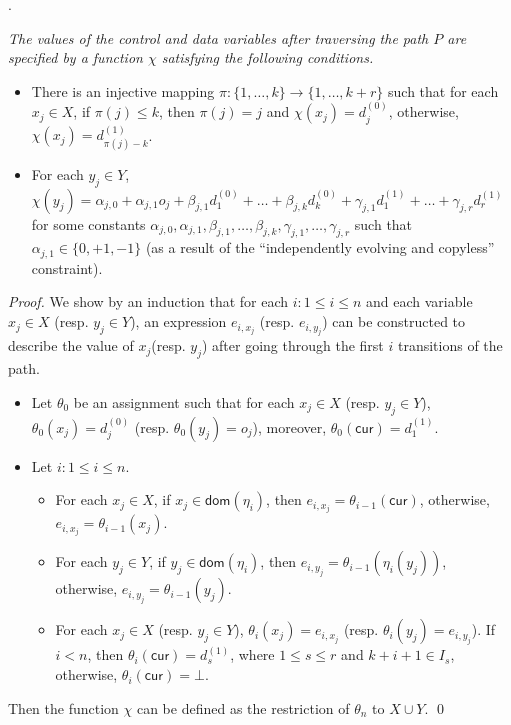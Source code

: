 \documentclass[runningheads,a4paper]{llncs}
\newcommand\cur{\mathsf{cur}}
\newcommand\dom{\mathsf{dom}}
\begin{document}
\begin{appendix}
.
{\it The values of the control and data variables after traversing the path $P$ are specified by a function $\chi$ satisfying the following conditions.
\begin{itemize}
\item There is an injective mapping $\pi: \{1,\dots,k\} \rightarrow \{1,\dots, k+r\}$ such that for each $x_j \in X$, if $\pi(j) \le k$, then $\pi(j)=j$ and $\chi(x_j)=d^{(0)}_{j}$, otherwise, $\chi(x_j)=d^{(1)}_{\pi(j)-k}$.
% 
\item For each $y_j \in Y$, $\chi(y_j) = \alpha_{j,0} + \alpha_{j,1} o_j + \beta_{j,1} d^{(0)}_1 + \dots + \beta_{j,k} d^{(0)}_k + \gamma_{j,1} d^{(1)}_1 +\dots + \gamma_{j,r} d^{(1)}_{r}$ for some constants $\alpha_{j,0},\alpha_{j,1}, \beta_{j,1},\dots,\beta_{j,k}, \gamma_{j,1},\dots,\gamma_{j,r}$ such that $\alpha_{j,1} \in \{0,+1,-1\}$ (as a result of the ``independently evolving and copyless'' constraint).
\end{itemize}
}

\begin{proof}
We show by an induction that for each $i: 1 \le i \le n$ and each variable $x_j \in X$ (resp. $y_j \in Y$), an expression $e_{i,x_j}$ (resp. $e_{i,y_j}$) can be constructed to describe the value of $x_j$(resp. $y_j$) after going through the first $i$ transitions of the path. 
%
\begin{itemize}
\item Let $\theta_0$ be an assignment such that for each $x_j \in X$ (resp. $y_j \in Y$), $\theta_0(x_j)=d^{(0)}_j$ (resp. $\theta_0(y_j)=o_j$), moreover, $\theta_0(\cur)=d^{(1)}_1$.
%
%
\item Let $i: 1 \le i \le n$. 
\begin{itemize}
\item For each $x_j \in X$, if $x_j \in \dom(\eta_i)$, then $e_{i,x_j}=\theta_{i-1}(\cur)$, otherwise, $e_{i,x_j}=\theta_{i-1}(x_j)$.
%
\item For each $y_j \in Y$, if $y_j \in \dom(\eta_i)$, then $e_{i,y_j} = \theta_{i-1}(\eta_i(y_j))$, otherwise, $e_{i,y_j}=\theta_{i-1}(y_j)$.
%
\item For each $x_{j} \in X$ (resp. $y_j \in Y$), $\theta_i(x_{j})=e_{i,x_{j}}$ (resp. $\theta_i(y_{j})=e_{i, y_{j}}$). If $i < n$, then $\theta_i(\cur)=d^{(1)}_{s}$, where $1\le s \le r$ and $k+i + 1 \in I_s$, otherwise, $\theta_i(\cur)=\bot$.
\end{itemize}
\end{itemize}
Then the function $\chi$ can be defined as the restriction of $\theta_n$ to $X \cup Y$.
\qed
\end{proof}



\end{appendix}
\end{document}

